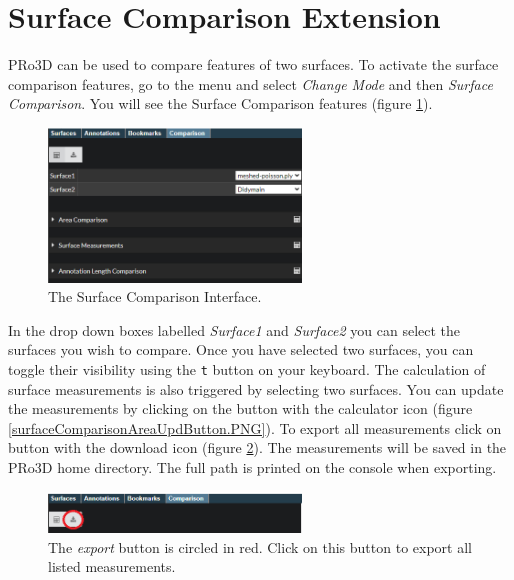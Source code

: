 \section{Surface Comparison Extension}

PRo3D can be used to compare features of two surfaces. To activate the surface comparison features, go to the menu and select \emph{Change Mode} and then \emph{Surface Comparison}. You will see the Surface Comparison features (figure  \ref{fig:surfaceComparison}).


\begin{figure}[h]
	\centering
	\includegraphics[width=0.6\textwidth]{pics/surfaceComparison.PNG}
	\caption[The surface comparison interface.]{The Surface Comparison Interface.}
	\label{fig:surfaceComparison}
\end{figure}

In the drop down boxes labelled \emph{Surface1} and \emph{Surface2} you can select the surfaces you wish to compare. Once you have selected two surfaces, you can toggle their visibility using the \texttt{t} button on your keyboard. The calculation of surface measurements is also triggered by selecting two surfaces. You can update the measurements by clicking on the button with the calculator icon (figure \ref{surfaceComparisonAreaUpdButton.PNG}). To export all measurements click on button with the download icon (figure \ref{surfaceComparisonAreaExpButton.PNG}). The measurements will be saved in the PRo3D home directory. The full path is printed on the console when exporting.

\begin{figure}[h]
	\centering
	\includegraphics[width=0.6\textwidth]{pics/surfaceComparisonAreaExpButton.PNG}
	\caption[The export button.]{The \emph{export} button is circled in red. Click on this button to export all listed measurements.}
	\label{surfaceComparisonAreaExpButton.PNG}
\end{figure}

